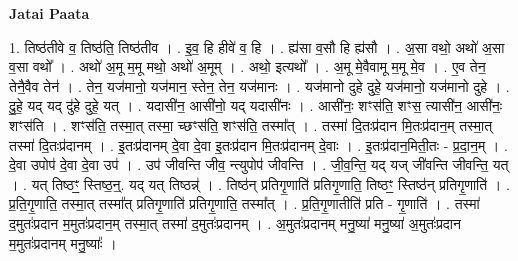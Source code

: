 \documentclass[17pt]{extarticle}
\begin{document}
\textbf{Jatai Paata} \newline

1. तिष्ठ॑तीवे व॒ तिष्ठ॑ति॒ तिष्ठ॑तीव । . इ॒व॒ हि हीवे॑ व॒ हि । . ह्य॑सा व॒सौ हि ह्य॑सौ । . अ॒सा वथो॒ अथो॑ अ॒सा व॒सा वथो᳚ । . अथो॑ अ॒मू म॒मू मथो॒ अथो॑ अ॒मूम् । . अथो॒ इत्यथो᳚ । . अ॒मू मे॒वैवामू म॒मू मे॒व । . ए॒व तेन॒ तेनै॒वैव तेन॑ । . तेन॒ यज॑मानो॒ यज॑मान॒ स्तेन॒ तेन॒ यज॑मानः । . यज॑मानो दुहे दुहे॒ यज॑मानो॒ यज॑मानो दुहे । . दु॒हे॒ यद् यद् दु॑हे दुहे॒ यत् । . यदासी॑न॒ आसी॑नो॒ यद् यदासी॑नः । . आसी॑नः॒ शꣳस॑ति॒ शꣳस॒ त्यासी॑न॒ आसी॑नः॒ शꣳस॑ति । . शꣳस॑ति॒ तस्मा॒त् तस्मा॒ च्छꣳस॑ति॒ शꣳस॑ति॒ तस्मा᳚त् । . तस्मा॑ दि॒तःप्र॑दान मि॒तःप्र॑दान॒म् तस्मा॒त् तस्मा॑ दि॒तःप्र॑दानम् । . इ॒तःप्र॑दानम् दे॒वा दे॒वा इ॒तःप्र॑दान मि॒तःप्र॑दानम् दे॒वाः । . इ॒तःप्र॑दान॒मिती॒तः - प्र॒दा॒न॒म् । . दे॒वा उपोप॑ दे॒वा दे॒वा उप॑ । . उप॑ जीवन्ति जीव॒ न्त्युपोप॑ जीवन्ति । . जी॒व॒न्ति॒ यद् यज् जी॑वन्ति जीवन्ति॒ यत् । . यत् तिष्ठꣳ॒॒ स्तिष्ठ॒न्॒. यद् यत् तिष्ठन्न्॑ । . तिष्ठ॑न् प्रतिगृ॒णाति॑ प्रतिगृ॒णाति॒ तिष्ठꣳ॒॒ स्तिष्ठ॑न् प्रतिगृ॒णाति॑ । . प्र॒ति॒गृ॒णाति॒ तस्मा॒त् तस्मा᳚त् प्रतिगृ॒णाति॑ प्रतिगृ॒णाति॒ तस्मा᳚त् । . प्र॒ति॒गृ॒णातीति॑ प्रति - गृ॒णाति॑ । . तस्मा॑ द॒मुतः॑प्रदान म॒मुतः॑प्रदान॒म् तस्मा॒त् तस्मा॑ द॒मुतः॑प्रदानम् । . अ॒मुतः॑प्रदानम् मनु॒ष्या॑ मनु॒ष्या॑ अ॒मुतः॑प्रदान म॒मुतः॑प्रदानम् मनु॒ष्याः᳚ । \newline
\end{document}
